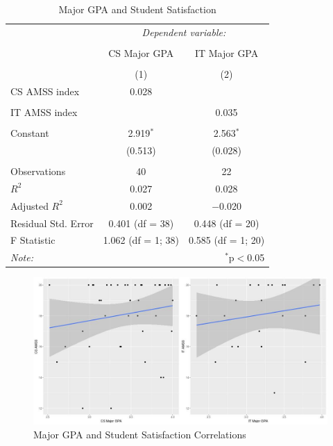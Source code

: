 \begin{table}[!htbp]
  \centering
  \vspace{1in}
  \caption{Major GPA and Student Satisfaction}
  \label{tab:c-satisfaction}
  \begin{tabular}{@{\extracolsep{5pt}}lcc}
    \toprule
     & \multicolumn{2}{c}{\textit{Dependent variable:}} \\
    \cline{2-3}
    \\[-1.8ex] & CS Major GPA & IT Major GPA \\
    \\[-1.8ex] & (1) & (2)\\
    \midrule
     CS AMSS index & 0.028 &  \\
      & & \\
     IT AMSS index &  & 0.035 \\
      & & \\
     Constant & 2.919$^{*}$ & 2.563$^{*}$ \\
      & (0.513) & (0.028) \\
      & & \\
    \midrule
    Observations & 40 & 22 \\
    $R^{2}$ & 0.027 & 0.028 \\
    Adjusted $R^{2}$ & 0.002 & $-$0.020 \\
    Residual Std. Error & 0.401 (df = 38) & 0.448 (df = 20) \\
    F Statistic & 1.062 (df = 1; 38) & 0.585 (df = 1; 20) \\
    \bottomrule
    \textit{Note:}  & \multicolumn{2}{r}{$^{*}$p$<$0.05} \\
  \end{tabular}
  \vspace{1in}
\end{table}

\begin{figure}[!hbtp]
  \centering
  \includegraphics[width=1.05\textwidth]{figures/chapter4/major_gpa_amss_plots.jpg}
  \caption{Major GPA and Student Satisfaction Correlations}
  \label{fig:c-major_gpa_amss_plots}
\end{figure}

